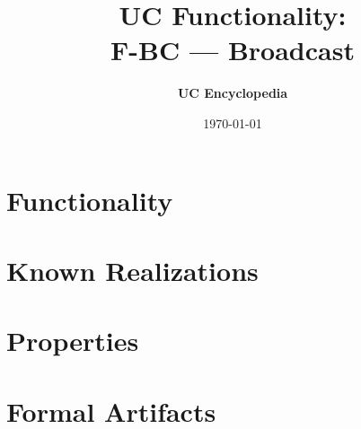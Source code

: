 \documentclass[11pt,a4paper]{article}
\title{\textbf{\Large UC Functionality:}\\[0.2em] \Large F-BC --- Broadcast}
\author{\textbf{UC Encyclopedia}}
\date{\today}
\newtheorem{functionality}{Functionality}
\begin{document}
\maketitle

\begin{abstract}
\end{abstract}

\section{Functionality}

%

\section{Known Realizations}


\section{Properties}


\section{Formal Artifacts}

\end{document}
